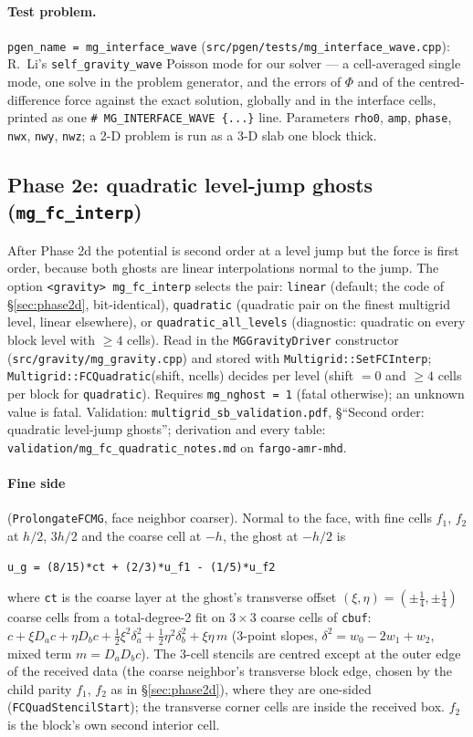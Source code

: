 \documentclass[11pt]{article}
\newcommand{\code}[1]{\texttt{#1}}
\newcommand{\file}[1]{\texttt{\small #1}}
\newcommand{\fn}[1]{\texttt{\small #1}}
\begin{document}
\paragraph{Test problem.} \code{pgen\_name = mg\_interface\_wave}
(\file{src/pgen/tests/mg\_interface\_wave.cpp}): R.~Li's \code{self\_gravity\_wave} Poisson mode
for our solver --- a cell-averaged single mode, one solve in the problem generator, and the errors
of $\Phi$ and of the centred-difference force against the exact solution, globally and in the
interface cells, printed as one \verb|# MG_INTERFACE_WAVE {...}| line. Parameters
\code{rho0}, \code{amp}, \code{phase}, \code{nwx}, \code{nwy}, \code{nwz}; a 2-D problem is
run as a 3-D slab one block thick.

\subsection{Phase 2e: quadratic level-jump ghosts (\code{mg\_fc\_interp})}
\label{sec:phase2e}

After Phase 2d the potential is second order at a level jump but the force is first order,
because both ghosts are linear interpolations normal to the jump. The option
\code{<gravity> mg\_fc\_interp} selects the pair:
\code{linear} (default; the code of \S\ref{sec:phase2d}, bit-identical),
\code{quadratic} (quadratic pair on the finest multigrid level, linear elsewhere), or
\code{quadratic\_all\_levels} (diagnostic: quadratic on every block level with $\ge 4$ cells).
Read in the \fn{MGGravityDriver} constructor (\file{src/gravity/mg\_gravity.cpp}) and stored with
\fn{Multigrid::SetFCInterp}; \fn{Multigrid::FCQuadratic}(shift, ncells) decides per level
(shift $= 0$ and $\ge 4$ cells per block for \code{quadratic}). Requires \code{mg\_nghost = 1}
(fatal otherwise); an unknown value is fatal. Validation: \file{multigrid\_sb\_validation.pdf},
\S``Second order: quadratic level-jump ghosts''; derivation and every table:
\file{validation/mg\_fc\_quadratic\_notes.md} on \code{fargo-amr-mhd}.

\paragraph{Fine side} (\fn{ProlongateFCMG}, face neighbor coarser). Normal to the face, with fine
cells $f_1$, $f_2$ at $h/2$, $3h/2$ and the coarse cell at $-h$, the ghost at $-h/2$ is
\begin{verbatim}
u_g = (8/15)*ct + (2/3)*u_f1 - (1/5)*u_f2
\end{verbatim}
where \code{ct} is the coarse layer at the ghost's transverse offset $(\xi,\eta) = (\pm\tfrac14,
\pm\tfrac14)$ coarse cells from a total-degree-2 fit on $3\times3$ coarse cells of \code{cbuf}:
$c + \xi D_a c + \eta D_b c + \tfrac12\xi^2\delta^2_a + \tfrac12\eta^2\delta^2_b + \xi\eta\,m$ (3-point
slopes, $\delta^2 = w_0 - 2w_1 + w_2$, mixed term $m = D_a D_b c$). The 3-cell stencils are centred
except at the outer edge of the received data (the coarse neighbor's transverse block edge, chosen
by the child parity $f_1$, $f_2$ as in \S\ref{sec:phase2d}), where they are one-sided
(\fn{FCQuadStencilStart}); the transverse corner cells are inside the received box.
$f_2$ is the block's own second interior cell.
\end{document}
